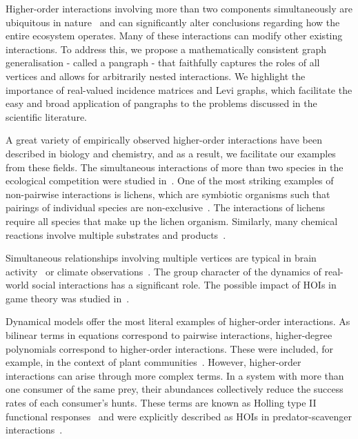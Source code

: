 \documentclass[a4paper,12pt]{article}
\theoremstyle{definition}
\theoremstyle{remark}
\begin{document}
    
     Higher-order interactions involving more than two components simultaneously are ubiquitous in nature~\cite{BATTISTON20201, hoi_book} and can significantly alter conclusions regarding how the entire ecosystem operates. Many of these interactions can modify other existing interactions. To address this,  we propose a mathematically consistent graph generalisation - called a pangraph - that faithfully captures the roles of all vertices and allows for arbitrarily nested interactions. We highlight the importance of real-valued incidence matrices and Levi graphs, which facilitate the easy and broad application of pangraphs to the problems discussed in the scientific literature. 

     A great variety of empirically observed higher-order interactions have been described in biology and chemistry, and as a result, we facilitate our examples from these fields. The simultaneous interactions of more than two species in the ecological competition were studied in~\cite{levine2017, letten_stouffer_non_additivity}. One of the most striking examples of non-pairwise interactions is lichens, which are symbiotic organisms such that pairings of individual species are non-exclusive~\cite {lichen_duran_nebreda}. The interactions of lichens require all species that make up the lichen organism. Similarly, many chemical reactions involve multiple substrates and  products~\cite{39_chemistry_Jost_2019}.

    Simultaneous relationships involving multiple vertices are typical in brain activity~\cite{37_brain_Giusti_2016, 38_brain_Faskowitz_2021} or climate observations~\cite{40_climate_Boers_2019, 41_climate_Su_2021}. The group character of the dynamics of real-world social interactions has a significant role. The possible impact of HOIs in game theory was studied in~\cite{53_Alvarez-Rodriguez_2020}.      

    Dynamical models offer the most literal examples of higher-order interactions. As bilinear terms in equations correspond to pairwise interactions, higher-degree polynomials correspond to higher-order interactions. These were included, for example, in the context of plant communities~\cite{Mayfield2017}. However, higher-order interactions can arise through more complex terms. In a system with more than one consumer of the same prey, their abundances collectively reduce the success rates of each consumer's hunts. These terms are known as Holling type II functional responses~\cite{Holling_1959} and were explicitly described as HOIs in predator-scavenger interactions~\cite{Getz_2011, Moleon_scavenging}.
\end{document}
